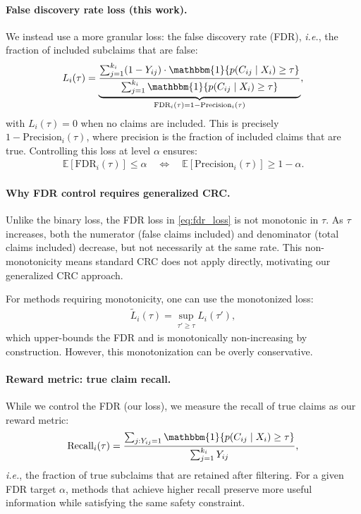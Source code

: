 \paragraph{False discovery rate loss (this work).} We instead use a more granular loss: the false discovery rate (FDR), \textit{i.e.}, the fraction of included subclaims that are false:
\begin{align}
    L_i(\tau) = \underbrace{\frac{\sum_{j=1}^{k_i} (1 - Y_{ij}) \cdot \mathbbm{1}\{p(C_{ij} \mid X_i) \geq \tau\}}{\sum_{j=1}^{k_i} \mathbbm{1}\{p(C_{ij} \mid X_i) \geq \tau\}}}_{\text{FDR}_i(\tau) = 1 - \text{Precision}_i(\tau)},
    \label{eq:fdr_loss}
\end{align}
with $L_i(\tau) = 0$ when no claims are included. This is precisely $1 - \text{Precision}_i(\tau)$, where precision is the fraction of included claims that are true. Controlling this loss at level $\alpha$ ensures:
\begin{align}
    \mathbb{E}[\text{FDR}_i(\tau)] \leq \alpha \quad \Longleftrightarrow \quad \mathbb{E}[\text{Precision}_i(\tau)] \geq 1 - \alpha.
\end{align}

\paragraph{Why FDR control requires generalized CRC.} Unlike the binary loss, the FDR loss in \eqref{eq:fdr_loss} is not monotonic in $\tau$. As $\tau$ increases, both the numerator (false claims included) and denominator (total claims included) decrease, but not necessarily at the same rate. This non-monotonicity means standard CRC \citep{angelopoulos2022conformal} does not apply directly, motivating our generalized CRC approach.

For methods requiring monotonicity, one can use the monotonized loss:
\begin{align}
    \tilde{L}_i(\tau) = \sup_{\tau' \geq \tau} L_i(\tau'),
\end{align}
which upper-bounds the FDR and is monotonically non-increasing by construction. However, this monotonization can be overly conservative.

\paragraph{Reward metric: true claim recall.} While we control the FDR (our loss), we measure the recall of true claims as our reward metric:
\begin{align}
    \text{Recall}_i(\tau) = \frac{\sum_{j: Y_{ij} = 1} \mathbbm{1}\{p(C_{ij} \mid X_i) \geq \tau\}}{\sum_{j=1}^{k_i} Y_{ij}},
    \label{eq:recall_metric}
\end{align}
\textit{i.e.}, the fraction of true subclaims that are retained after filtering. For a given FDR target $\alpha$, methods that achieve higher recall preserve more useful information while satisfying the same safety constraint.

